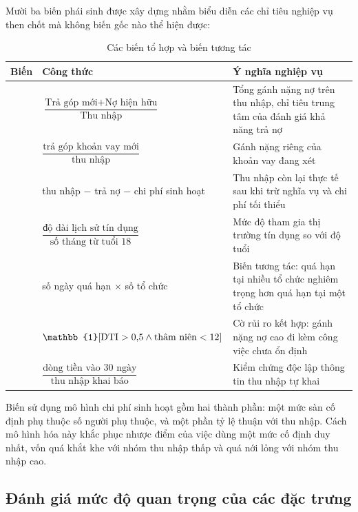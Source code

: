 Mười ba biến phái sinh được xây dựng nhằm biểu diễn các chỉ tiêu nghiệp vụ then
chốt mà không biến gốc nào thể hiện được:

\begin{table}[htbp]
\centering
\caption{Các biến tổ hợp và biến tương tác}
\label{tab:derived-features}
\small
\setlength{\tabcolsep}{4pt}
\begin{tabular}{@{}L{3.3cm}C{5.3cm}L{6.1cm}@{}}
\toprule
\textbf{Biến} & \textbf{Công thức} & \textbf{Ý nghĩa nghiệp vụ} \\
\midrule
{} &
$\dfrac{\text{Trả góp mới} + \text{Nợ hiện hữu}}{\text{Thu nhập}}$ &
Tổng gánh nặng nợ trên thu nhập, chỉ tiêu trung tâm của đánh giá khả năng trả nợ
\\[6pt]
 &
$\dfrac{\text{trả góp khoản vay mới}}{\text{thu nhập}}$ &
Gánh nặng riêng của khoản vay đang xét \\[6pt]
 &
thu nhập $-$ trả nợ $-$ chi phí sinh hoạt &
Thu nhập còn lại thực tế sau khi trừ nghĩa vụ và chi phí tối thiểu \\[6pt]
 &
$\dfrac{\text{độ dài lịch sử tín dụng}}{\text{số tháng từ tuổi 18}}$ &
Mức độ tham gia thị trường tín dụng so với độ tuổi \\[6pt]
 &
số ngày quá hạn $\times$ số tổ chức &
Biến tương tác: quá hạn tại nhiều tổ chức nghiêm trọng hơn quá hạn tại một tổ
chức \\[6pt]
 &
$\mathbb{1}[\DTI > 0{,}5 \wedge \text{thâm niên} < 12]$ &
Cờ rủi ro kết hợp: gánh nặng nợ cao đi kèm công việc chưa ổn định \\[6pt]
 &
$\dfrac{\text{dòng tiền vào 30 ngày}}{\text{thu nhập khai báo}}$ &
Kiểm chứng độc lập thông tin thu nhập tự khai \\
\bottomrule
\end{tabular}
\end{table}

Biến  sử dụng mô hình chi phí sinh hoạt gồm hai thành
phần: một mức sàn cố định phụ thuộc số người phụ thuộc, và một phần tỷ lệ thuận
với thu nhập. Cách mô hình hóa này khắc phục nhược điểm của việc dùng một mức cố
định duy nhất, vốn quá khắt khe với nhóm thu nhập thấp và quá nới lỏng với nhóm
thu nhập cao.

\subsection{Đánh giá mức độ quan trọng của các đặc trưng}
\label{subsec:danh-gia-dac-trung}

